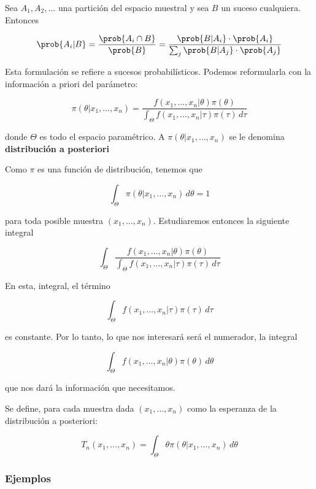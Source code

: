 \documentclass{apuntes}
\begin{document}
\begin{theorem} Sea $A_1,A_2,\dotsc$ una partición del espacio muestral y sea $B$ un suceso cualquiera. Entonces

\[ \prob{A_i|B} = \frac{\prob{A_i\cap B}}{\prob{B}} = \frac{\prob{B|A_i}\cdot \prob{A_i}}{\sum_j \prob{B|A_j}\cdot \prob{A_j}} \]

Esta formulación se refiere a sucesos probabilísticos. Podemos reformularla con la información a priori del parámetro:

\begin{equation}
\label{eqBayes}
 \pi(\theta | x_1,\dotsc,x_n) = \frac{f(x_1,\dotsc,x_n|\theta)\pi(\theta)}{\displaystyle \int_\Theta f(x_1,\dotsc,x_n|\tau)\pi(\tau)\,d\tau}
 \end{equation}

donde $\Theta$ es todo el espacio paramétrico. A $ \pi(\theta | x_1,\dotsc,x_n) $ se le denomina \textbf{distribución a posteriori}
\end{theorem}

Como $\pi$ es una función de distribución, tenemos que

\[ \int_\Theta \pi(\theta|x_1,\dotsc,x_n)\,d\theta = 1 \]

para toda posible muestra $(x_1,\dotsc,x_n)$. Estudiaremos entonces la siguiente integral

\[ \int_\Theta \frac{f(x_1,\dotsc,x_n|\theta)\pi(\theta)}{\displaystyle \int_\Theta f(x_1,\dotsc,x_n|\tau)\pi(\tau)\,d\tau} \]

En esta, integral, el término

\[ \int_\Theta f(x_1,\dotsc,x_n|\tau)\pi(\tau)\,d\tau \]

es constante. Por lo tanto, lo que nos interesará será el numerador, la integral

\[ \int_\Theta f(x_1,\dotsc,x_n|\theta)\pi(\theta)\,d\theta \]

que nos dará la información que necesitamos.

\begin{defn} Se define, para cada muestra dada $(x_1,\dotsc,x_n)$ como la esperanza de la distribución a posteriori:

\[ T_n(x_1,\dotsc,x_n) = \int_\Theta \theta\pi(\theta|x_1,\dotsc,x_n)\,d\theta \]
\end{defn}


\subsubsection{Ejemplos}
\end{document}
